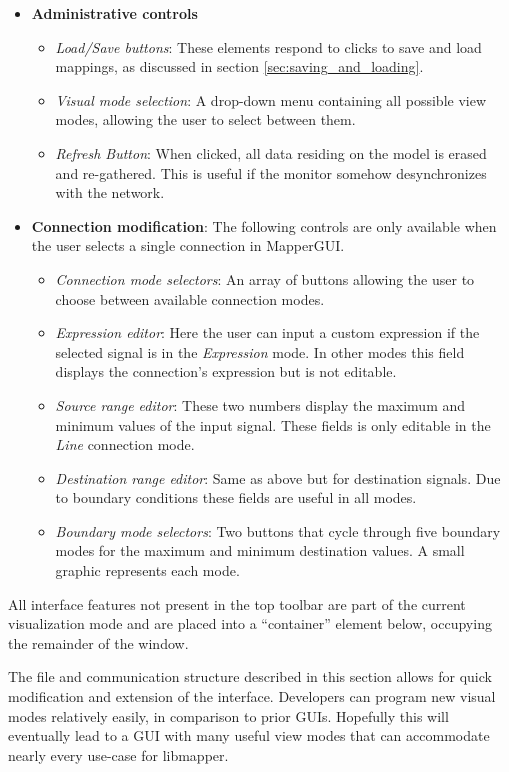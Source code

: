\begin{itemize}
	\item \textbf{Administrative controls}
	\begin{itemize}
		\item\emph{Load/Save buttons}: These elements respond to clicks to save and load mappings, as discussed in section \ref{sec:saving_and_loading}.
		\item\emph{Visual mode selection}: A drop-down menu containing all possible view modes, allowing the user to select between them.
		\item\emph{Refresh Button}: When clicked, all data residing on the model is erased and re-gathered. This is useful if the monitor somehow desynchronizes with the network.
	\end{itemize}

	\item \textbf{Connection modification}: The following controls are only available when the user selects a single connection in MapperGUI.
	\begin{itemize}
		\item\emph{Connection mode selectors}: An array of buttons allowing the user to choose between available connection modes.
		\item\emph{Expression editor}: Here the user can input a custom expression if the selected signal is in the \emph{Expression} mode. In other modes this field displays the connection's expression but is not editable.
		\item\emph{Source range editor}: These two numbers display the maximum and minimum values of the input signal. These fields is only editable in the \emph{Line} connection mode.
		\item\emph{Destination range editor}: Same as above but for destination signals. Due to boundary conditions these fields are useful in all modes.
		\item\emph{Boundary mode selectors}: Two buttons that cycle through five boundary modes for the maximum and minimum destination values. A small graphic represents each mode.
	\end{itemize}
\end{itemize}

All interface features not present in the top toolbar are part of the current visualization mode and are placed into a ``container'' element below, occupying the remainder of the window.


The file and communication structure described in this section allows for quick modification and extension of the interface. Developers can program new visual modes relatively easily, in comparison to prior GUIs. Hopefully this will eventually lead to a GUI with many useful view modes that can accommodate nearly every use-case for libmapper.

